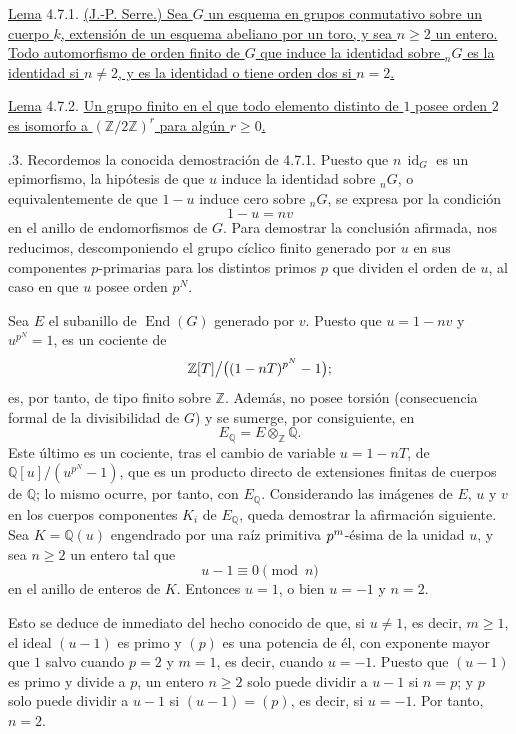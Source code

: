 \medskip
\noindent
\underline{Lema} 4.7.1. \underline{(J.-P. Serre.) Sea $G$ un esquema
en grupos conmutativo sobre un cuerpo $k$, extensión de un esquema
abeliano por un toro, y sea $n\geq2$ un entero. Todo automorfismo de
orden finito de $G$ que induce la identidad sobre ${}_nG$ es la
identidad si $n\neq2$, y es la identidad o tiene orden dos si $n=2$.}

\medskip
\noindent
\underline{Lema} 4.7.2. \underline{Un grupo finito en el que todo
elemento distinto de $1$ posee orden $2$ es isomorfo a
$(\mathbb Z/2\mathbb Z)^r$ para algún $r\geq0$.}

\smallskip
{}.3. Recordemos la conocida demostración de 4.7.1. Puesto que
$n\,\operatorname{id}_G$ es un epimorfismo, la hipótesis de que $u$
induce la identidad sobre ${}_nG$, o equivalentemente de que $1-u$
induce cero sobre ${}_nG$, se expresa por la condición
\[
 1-u=nv
\]
en el anillo de endomorfismos de $G$. Para demostrar la conclusión
afirmada, nos reducimos, descomponiendo el grupo cíclico finito generado
por $u$ en sus componentes $p$-primarias para los distintos primos $p$
que dividen el orden de $u$, al caso en que $u$ posee orden $p^N$.

Sea $E$ el subanillo de $\operatorname{End}(G)$ generado por $v$.
Puesto que $u=1-nv$ y $u^{p^N}=1$, es un cociente de
\[
 \mathbb Z[T]\big/\bigl(\sisi{T^{p^N}-1}{(1-nT)^{p^N}-1}\bigr);
\]
es, por tanto, de tipo finito sobre $\mathbb Z$. Además, no posee
torsión (consecuencia formal de la divisibilidad de $G$) y se sumerge,
por consiguiente, en
\[
 E_{\mathbb Q}=E\otimes_{\mathbb Z}\mathbb Q.
\]
Este último es un cociente, tras el cambio de variable $u=1-nT$, de
$\mathbb Q[u]/(u^{p^N}-1)$, que es un producto directo de extensiones
finitas de cuerpos de $\mathbb Q$; lo mismo ocurre, por tanto, con
$E_{\mathbb Q}$. Considerando las imágenes de $E$, $u$ y $v$ en los
cuerpos componentes $K_i$ de $E_{\mathbb Q}$, queda demostrar la
afirmación siguiente. Sea $K=\mathbb Q(u)$ engendrado por una raíz
primitiva $p^{\sisi{n}{m}}$-ésima de la unidad $u$, y sea $n\geq2$ un
entero tal que
\[
 u-1\equiv0\pmod n
\]
en el anillo de enteros de $K$. Entonces $u=1$, o bien $u=-1$ y $n=2$.

Esto se deduce de inmediato del hecho conocido de que, si $u\neq1$, es
decir, $m\geq1$, el ideal $(u-1)$ es primo y $(p)$ es una potencia de
él, con exponente mayor que $1$ salvo cuando $p=2$ y $m=1$, es decir,
cuando $u=-1$. Puesto que $(u-1)$ es primo y divide a $p$, un entero
$n\geq2$ solo puede dividir a $u-1$ si $n=p$; y $p$ solo puede dividir
a $u-1$ si $(u-1)=(p)$, es decir, si $u=-1$. Por tanto, $n=2$.

